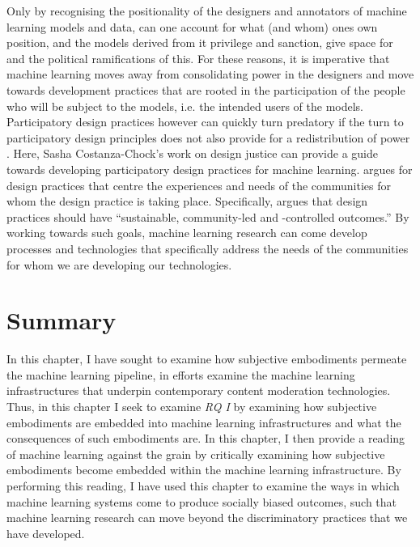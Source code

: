 {Only by recognising the positionality of the designers and annotators of machine learning models and data, can one account for what (and whom) ones own position, and the models derived from it privilege and sanction, give space for and the political ramifications of this.
For these reasons, it is imperative that machine learning moves away from consolidating power in the designers and move towards development practices that are rooted in the participation of the people who will be subject to the models, i.e. the intended users of the models.
Participatory design practices however can quickly turn predatory if the turn to participatory design principles does not also provide for a redistribution of power \citep{Kelly_2019}.
Here, Sasha Costanza-Chock's \citeyearpar{Costanza-Chock_2018} work on design justice can provide a guide towards developing participatory design practices for machine learning.
\citet{Costanza-Chock_2018} argues for design practices that centre the experiences and needs of the communities for whom the design practice is taking place.
Specifically, \citet{Costanza-Chock_2018} argues that design practices should have ``sustainable, community-led and -controlled outcomes.''
By working towards such goals, machine learning research can come develop processes and technologies that specifically address the needs of the communities for whom we are developing our technologies.

\section{Summary}
In this chapter, I have sought to examine how subjective embodiments permeate the machine learning pipeline, in efforts examine the machine learning infrastructures that underpin contemporary content moderation technologies.
Thus, in this chapter I seek to examine \textit{RQ I} by examining how subjective embodiments are embedded into machine learning infrastructures and what the consequences of such embodiments are.
In this chapter, I then provide a reading of machine learning against the grain by critically examining how subjective embodiments become embedded within the machine learning infrastructure.
By performing this reading, I have used this chapter to examine the ways in which machine learning systems come to produce socially biased outcomes, such that machine learning research can move beyond the discriminatory practices that we have developed.

}
